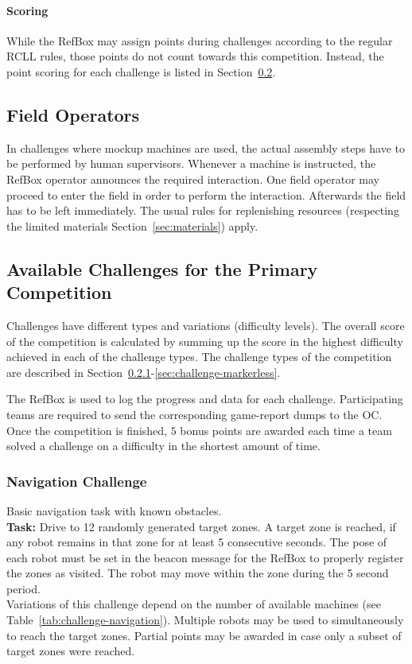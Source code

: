 \documentclass[12pt,twoside]{article}
\newcommand{\refsec}[1]{Section~\ref{#1}}
\newcommand{\reftab}[1]{Table~\ref{#1}}
\begin{document}
\paragraph{Scoring}\label{sec:scoring}
While the RefBox may assign points during challenges according to the
regular RCLL rules, those points do not count towards this competition.
Instead, the point scoring for each challenge is listed in
\refsec{sec:challenges}.

\subsection{Field Operators}\label{sec:operators}
In challenges where mockup machines are used, the actual assembly steps have
to be performed by human supervisors. Whenever a machine is instructed,
the RefBox operator announces the required interaction. One field operator may
proceed to enter the field in order to perform the interaction. Afterwards the
field has to be left immediately.
The usual rules for replenishing resources (respecting the limited materials
\refsec{sec:materials}) apply.

\subsection{Available Challenges for the Primary Competition}
\label{sec:challenges}
Challenges have different types and variations (difficulty levels).
The overall score of the competition is calculated by summing up the score
in the highest difficulty achieved in each of the challenge types.
The challenge types of the competition are described in
\refsec{sec:challenge-navigation}-\ref{sec:challenge-markerless}.

The RefBox is used to log the progress and data for each challenge.
Participating teams are required to send the corresponding game-report dumps to the OC.
Once the competition is finished, $5$ bonus points are awarded each time a
team solved a challenge on a difficulty in the shortest amount of time.

\subsubsection{Navigation Challenge}\label{sec:challenge-navigation}
Basic navigation task with known obstacles.\\
\textbf{Task:} Drive to 12 randomly generated target zones. A target zone is
reached, if any robot remains in that zone for at least 5 consecutive seconds.
The pose of each robot must be set in the beacon message
for the RefBox to properly register the zones as visited. The robot may move
within the zone during the 5 second period.\\
Variations of this challenge depend on the number of available machines
(see \reftab{tab:challenge-navigation}).
Multiple robots may be used to simultaneously to reach the target zones.
Partial points may be awarded in case only a subset of target zones were
reached.
\end{document}
